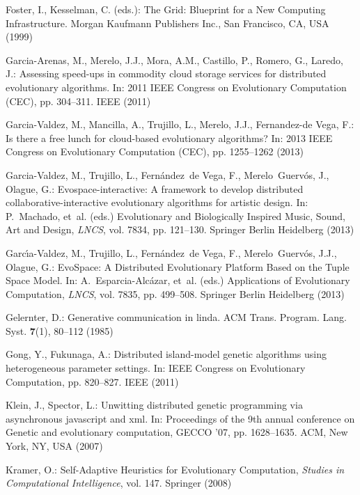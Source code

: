 \begin{thebibliography}{10}
Foster, I., Kesselman, C. (eds.): The Grid: Blueprint for a New Computing
  Infrastructure.
\newblock Morgan Kaufmann Publishers Inc., San Francisco, CA, USA (1999)

Garcia-Arenas, M., Merelo, J.J., Mora, A.M., Castillo, P., Romero, G., Laredo,
  J.: Assessing speed-ups in commodity cloud storage services for distributed
  evolutionary algorithms.
\newblock In: 2011 IEEE Congress on Evolutionary Computation (CEC), pp.
  304--311. IEEE (2011)

Garcia-Valdez, M., Mancilla, A., Trujillo, L., Merelo, J.J., Fernandez-de Vega,
  F.: Is there a free lunch for cloud-based evolutionary algorithms?
\newblock In: 2013 IEEE Congress on Evolutionary Computation (CEC), pp.
  1255--1262 (2013)

Garcia-Valdez, M., Trujillo, L., Fern{\'a}ndez~de Vega, F., Merelo~Guerv{\'o}s,
  J., Olague, G.: Evospace-interactive: A framework to develop distributed
  collaborative-interactive evolutionary algorithms for artistic design.
\newblock In: P.~Machado, et~al. (eds.) Evolutionary and Biologically Inspired
  Music, Sound, Art and Design, \emph{LNCS}, vol. 7834, pp. 121--130. Springer
  Berlin Heidelberg (2013)

Garc{\'\i}a-Valdez, M., Trujillo, L., Fern{\'a}ndez~de Vega, F.,
  Merelo~Guerv\'os, J.J., Olague, G.: {EvoSpace: A Distributed Evolutionary
  Platform Based on the Tuple Space Model}.
\newblock In: A.~Esparcia-Alc{\'a}zar, et~al. (eds.) Applications of
  Evolutionary Computation, \emph{LNCS}, vol. 7835, pp. 499--508. Springer
  Berlin Heidelberg (2013)

Gelernter, D.: Generative communication in linda.
\newblock ACM Trans. Program. Lang. Syst. \textbf{7}(1), 80--112 (1985)

Gong, Y., Fukunaga, A.: Distributed island-model genetic algorithms using
  heterogeneous parameter settings.
\newblock In: IEEE Congress on Evolutionary Computation, pp. 820--827. IEEE
  (2011)

Klein, J., Spector, L.: Unwitting distributed genetic programming via
  asynchronous javascript and xml.
\newblock In: Proceedings of the 9th annual conference on Genetic and
  evolutionary computation, GECCO '07, pp. 1628--1635. ACM, New York, NY, USA
  (2007)

Kramer, O.: Self-Adaptive Heuristics for Evolutionary Computation,
  \emph{Studies in Computational Intelligence}, vol. 147.
\newblock Springer (2008)


\end{thebibliography}
